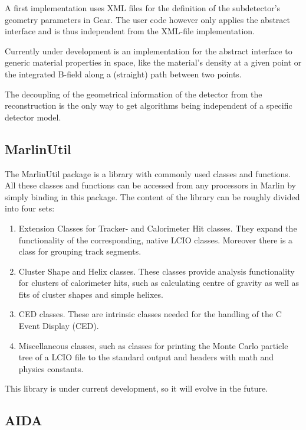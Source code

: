 A first implementation uses XML files for the definition of the
subdetector's geometry parameters in Gear. The user code however only applies 
the abstract interface and is thus independent from the XML-file
implementation.

Currently under development is an
implementation for the abstract interface to generic material
properties in space, like the material's density at a given point or
the integrated B-field along a (straight) path between two points.

The decoupling of the geometrical 
information of the detector from the reconstruction is the only way to get
algorithms being independent of a specific detector model. 

\subsection{MarlinUtil}

The MarlinUtil package is a library with commonly used classes and functions. 
All these classes and functions can be accessed from any processors in 
Marlin by simply binding in this package. The content of the library can be 
roughly divided into four sets:

\begin{enumerate}
\item Extension Classes for Tracker- and Calorimeter Hit classes. 
      They expand the functionality of the corresponding, native LCIO classes.
      Moreover there is a class for grouping track segments.
\item Cluster Shape and Helix classes. These classes provide analysis 
      functionality for clusters of calorimeter hits, such as calculating 
      centre of gravity as well as fits of cluster shapes and simple helixes.
\item CED classes. These are intrinsic classes needed for the handling of the 
      C Event Display (CED).
\item Miscellaneous classes, such as classes for printing the Monte Carlo 
      particle tree of a LCIO file to the standard output and headers with 
      math and physics constants.
\end{enumerate}

This library is under current development, so it will evolve in the future.

\subsection{AIDA}

